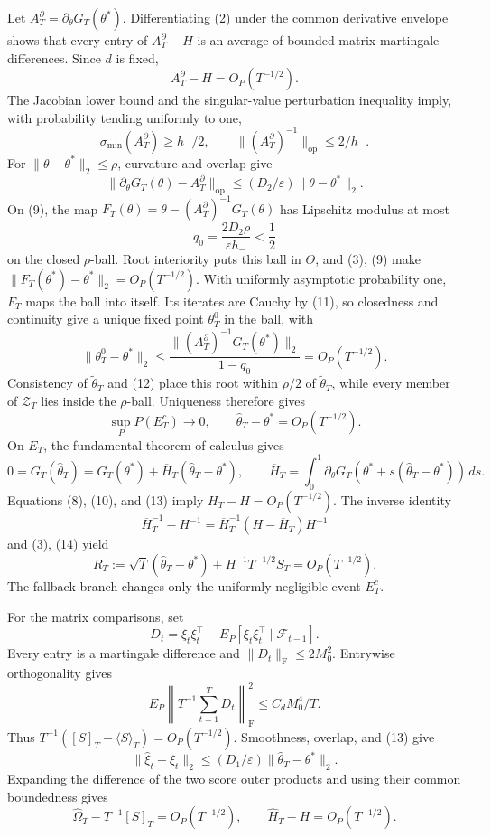 Let \(A_T^\partial=\partial_\theta G_T(\theta^*)\).  Differentiating (2)
under the common derivative envelope shows that every entry of
\(A_T^\partial-H\) is an average of bounded matrix martingale differences.
Since \(d\) is fixed,
\[
 A_T^\partial-H=O_P(T^{-1/2}).
\tag{8}
\]
The Jacobian lower bound and the singular-value perturbation inequality imply,
with probability tending uniformly to one,
\[
 \sigma_{\min}(A_T^\partial)\ge h_-/2,
 \qquad \|(A_T^\partial)^{-1}\|_{\mathrm{op}}\le2/h_-.
\tag{9}
\]
For \(\|\theta-\theta^*\|_2\le\rho\), curvature and overlap give
\[
 \|\partial_\theta G_T(\theta)-A_T^\partial\|_{\mathrm{op}}
 \le(D_2/\varepsilon)\|\theta-\theta^*\|_2.
\tag{10}
\]
On (9), the map
\(F_T(\theta)=\theta-(A_T^\partial)^{-1}G_T(\theta)\) has Lipschitz
modulus at most
\[
 q_0=\frac{2D_2\rho}{\varepsilon h_-}<\frac12
\tag{11}
\]
on the closed \(\rho\)-ball.  Root interiority puts this ball in \(\Theta\),
and (3), (9) make
\(\|F_T(\theta^*)-\theta^*\|_2=O_P(T^{-1/2})\).  With uniformly asymptotic
probability one, \(F_T\) maps the ball into itself.  Its iterates are Cauchy
by (11), so closedness and continuity give a unique fixed point
\(\theta_T^0\) in the ball, with
\[
 \|\theta_T^0-\theta^*\|_2
 \le\frac{\|(A_T^\partial)^{-1}G_T(\theta^*)\|_2}{1-q_0}
 =O_P(T^{-1/2}).
\tag{12}
\]
Consistency of \(\widetilde\theta_T\) and (12) place this root within
\(\rho/2\) of \(\widetilde\theta_T\), while every member of \(\mathcal Z_T\)
lies inside the \(\rho\)-ball.  Uniqueness therefore gives
\[
 \sup_P P(E_T^c)\longrightarrow0,
 \qquad \widehat\theta_T-\theta^*=O_P(T^{-1/2}).
\tag{13}
\]
On \(E_T\), the fundamental theorem of calculus gives
\[
 0=G_T(\widehat\theta_T)=G_T(\theta^*)+\overline H_T
 (\widehat\theta_T-\theta^*),
 \qquad
 \overline H_T=\int_0^1\partial_\theta G_T
 (\theta^*+s(\widehat\theta_T-\theta^*))\,ds.
\tag{14}
\]
Equations (8), (10), and (13) imply
\(\overline H_T-H=O_P(T^{-1/2})\).  The inverse identity
\[
 \overline H_T^{-1}-H^{-1}
 =\overline H_T^{-1}(H-\overline H_T)H^{-1}
\tag{15}
\]
and (3), (14) yield
\[
 R_T:=\sqrt T(\widehat\theta_T-\theta^*)
 +H^{-1}T^{-1/2}S_T=O_P(T^{-1/2}).
\tag{16}
\]
The fallback branch changes only the uniformly negligible event \(E_T^c\).

For the matrix comparisons, set
\[
 D_t=\xi_t\xi_t^\top-E_P[\xi_t\xi_t^\top\mid\mathcal F_{t-1}].
\tag{17}
\]
Every entry is a martingale difference and
\(\|D_t\|_{\mathrm F}\le2M_0^2\).  Entrywise orthogonality gives
\[
 E_P\left\|T^{-1}\sum_{t=1}^TD_t\right\|_{\mathrm F}^2
 \le C_dM_0^4/T.
\tag{18}
\]
Thus \(T^{-1}([S]_T-\langle S\rangle_T)=O_P(T^{-1/2})\).  Smoothness,
overlap, and (13) give
\[
 \|\widehat\xi_t-\xi_t\|_2
 \le(D_1/\varepsilon)\|\widehat\theta_T-\theta^*\|_2.
\tag{19}
\]
Expanding the difference of the two score outer products and using their
common boundedness gives
\[
 \widehat\Omega_T-T^{-1}[S]_T=O_P(T^{-1/2}),
 \qquad \widehat H_T-H=O_P(T^{-1/2}).
\tag{20}
\]

